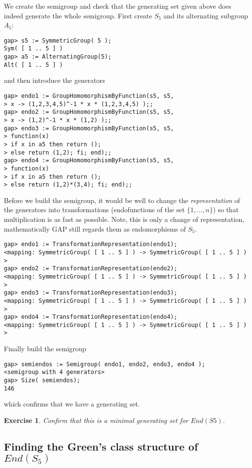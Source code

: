 \documentclass[12pt]{article}
\theoremstyle{plain} \newtheorem{Thm}{Theorem}
\theoremstyle{plain} \newtheorem{Cor}{Corollary}
\theoremstyle{plain} \newtheorem{Lemma}{Lemma}
\theoremstyle{plain} \newtheorem{Prop}{Proposition}
\theoremstyle{plain} \newtheorem{Ex}{Exercise}
\def\gap{\sf GAP}
\begin{document}
We create the semigroup and check that the generating
set given above does indeed generate the whole semigroup.
First create $S_5$ and its alternating subgroup $A_5$:
\begin{verbatim}
gap> s5 := SymmetricGroup( 5 );
Sym( [ 1 .. 5 ] )
gap> a5 := AlternatingGroup(5);
Alt( [ 1 .. 5 ] )
\end{verbatim}
and then introduce the generators 
\begin{verbatim}
gap> endo1 := GroupHomomorphismByFunction(s5, s5,                     
> x -> (1,2,3,4,5)^-1 * x * (1,2,3,4,5) );;
gap> endo2 := GroupHomomorphismByFunction(s5, s5,
> x -> (1,2)^-1 * x * (1,2) );;
gap> endo3 := GroupHomomorphismByFunction(s5, s5,
> function(x) 
> if x in a5 then return (); 
> else return (1,2); fi; end);;
gap> endo4 := GroupHomomorphismByFunction(s5, s5,
> function(x) 
> if x in a5 then return (); 
> else return (1,2)*(3,4); fi; end);;
\end{verbatim}

Before we build the semigroup, it would be well to change the 
{\em representation} of the generators into transformations
(endofunctions of the set $\{1, \ldots, n\}$)
so that multiplication is as fast as possible. Note, this is only 
a change of representation, mathematically {\gap} still regards them
as endomorphisms of $S_5$.
\begin{verbatim}
gap> endo1 := TransformationRepresentation(endo1);
<mapping: SymmetricGroup( [ 1 .. 5 ] ) -> SymmetricGroup( [ 1 .. 5 ] ) >
gap> endo2 := TransformationRepresentation(endo2);
<mapping: SymmetricGroup( [ 1 .. 5 ] ) -> SymmetricGroup( [ 1 .. 5 ] ) >
gap> endo3 := TransformationRepresentation(endo3);
<mapping: SymmetricGroup( [ 1 .. 5 ] ) -> SymmetricGroup( [ 1 .. 5 ] ) >
gap> endo4 := TransformationRepresentation(endo4);
<mapping: SymmetricGroup( [ 1 .. 5 ] ) -> SymmetricGroup( [ 1 .. 5 ] ) >
\end{verbatim}
Finally build the semigroup
\begin{verbatim}
gap> semiendos := Semigroup( endo1, endo2, endo3, endo4 );
<semigroup with 4 generators>
gap> Size( semiendos);
146
\end{verbatim}
which confirms that we have a generating set.

\begin{Ex}
Confirm that this is a minimal generating set for $End(S5)$.
\end{Ex}

\subsection{Finding the Green's class structure of $End(S_5)$}
        
\end{document}
